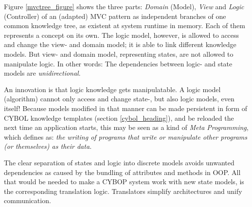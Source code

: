 Figure \ref{mvctree_figure} shows the three parts: \emph{Domain} (Model),
\emph{View} and \emph{Logic} (Controller) of an (adapted) MVC pattern as
independent branches of one common knowledge tree, as existent at system
runtime in memory. Each of them represents a concept on its own. The logic
model, however, is allowed to access and change the view- and domain model; it
is able to link different knowledge models. But view- and domain model,
representing states, are not allowed to manipulate logic. In other words: The
dependencies between logic- and state models are \emph{unidirectional}.

An innovation is that logic knowledge gets manipulatable. A logic model
(algorithm) cannot only access and change state-, but also logic models, even
itself! Because models modified in that manner can be made persistent in form
of CYBOL knowledge templates (section \ref{cybol_heading}), and be reloaded the
next time an application starts, this may be seen as a kind of
\emph{Meta Programming}, which \cite{wikipedia} defines as: \textit{the writing
of programs that write or manipulate other programs (or themselves) as their
data.}

The clear separation of states and logic into discrete models avoids unwanted
dependencies as caused by the bundling of attributes and methods in OOP. All
that would be needed to make a CYBOP system work with new state models, is the
corresponding translation logic. Translators \cite{hellerkunze} simplify
architectures and unify communication.
